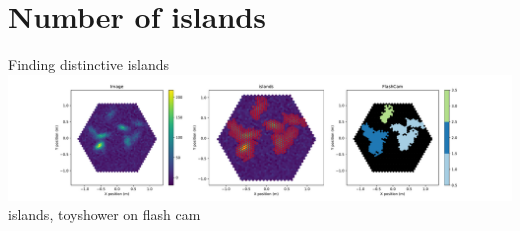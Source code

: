 
\section{Number of islands}
\begin{frame}{Finding distinctive islands}
    \includegraphics[width=\linewidth]{images/islands.pdf}
    islands, toyshower on flash cam
\end{frame}